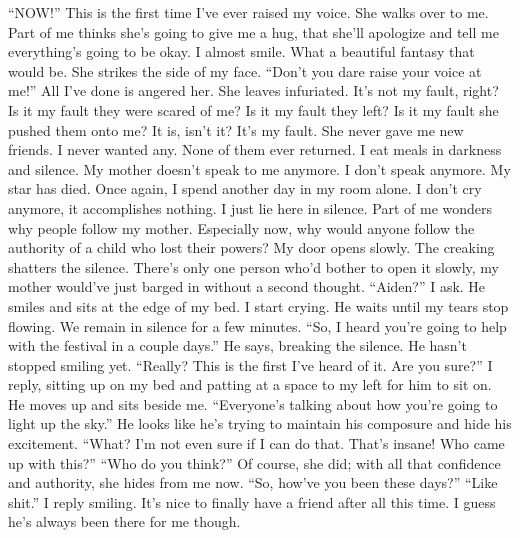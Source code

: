 \documentclass[openany, 12pt]{book}
\newcommand\tab[1][1cm]{\hspace*{#1}}
\begin{document}
\tab
``NOW!'' This is the first time I’ve ever raised my voice.
\newline
\tab
She walks over to me. Part of me thinks she’s going to give me a hug, that she’ll apologize and tell me everything’s going to be okay. I almost smile. What a beautiful fantasy that would be. She strikes the side of my face. ``Don’t you dare raise your voice at me!'' All I’ve done is angered her.  She leaves infuriated. It’s not my fault, right? Is it my fault they were scared of me? Is it my fault they left? Is it my fault she pushed them onto me? It is, isn’t it? It’s my fault.
\newline
\tab
She never gave me new friends. I never wanted any. None of them ever returned. I eat meals in darkness and silence. My mother doesn’t speak to me anymore. I don’t speak anymore. My star has died. Once again, I spend another day in my room alone. I don’t cry anymore, it accomplishes nothing. I just lie here in silence. Part of me wonders why people follow my mother. Especially now, why would anyone follow the authority of a child who lost their powers?
\newline
\tab
My door opens slowly. The creaking shatters the silence. There’s only one person who’d bother to open it slowly, my mother would’ve just barged in without a second thought. ``Aiden?'' I ask. He smiles and sits at the edge of my bed. I start crying. He waits until my tears stop flowing. We remain in silence for a few minutes.
\newline
\tab
``So, I heard you’re going to help with the festival in a couple days.'' He says, breaking the silence. He hasn’t stopped smiling yet.
\newline
\tab
``Really? This is the first I’ve heard of it. Are you sure?'' I reply, sitting up on my bed and patting at a space to my left for him to sit on.
\newline
\tab
He moves up and sits beside me. ``Everyone’s talking about how you’re going to light up the sky.'' He looks like he’s trying to maintain his composure and hide his excitement.
\newline
\tab
``What? I’m not even sure if I can do that. That’s insane! Who came up with this?''
\newline
\tab
``Who do you think?'' Of course, she did; with all that confidence and authority, she hides from me now. ``So, how’ve you been these days?''
\newline
\tab
``Like shit.'' I reply smiling. It’s nice to finally have a friend after all this time. I guess he’s always been there for me though.
\end{document}

